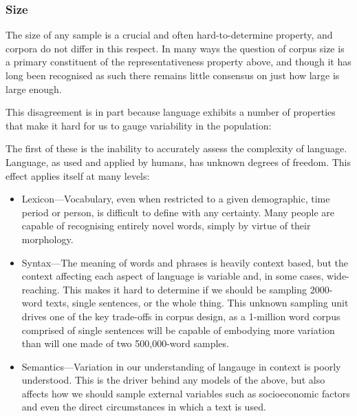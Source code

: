 









\subsubsection{Size}

The size of any sample is a crucial and often hard-to-determine property, and corpora do not differ in this respect.  In many ways the question of corpus size is a primary constituent of the representativeness property above, and though it has long been recognised as such there remains little consensus on just how large is large enough.

This disagreement is in part because language exhibits a number of properties that make it hard for us to gauge variability in the population:


The first of these is the inability to accurately assess the complexity of language.  Language, as used and applied by humans, has unknown degrees of freedom.  This effect applies itself at many levels:

\begin{itemize}
    \item Lexicon---Vocabulary, even when restricted to a given demographic, time period or person, is difficult to define with any certainty.  Many people are capable of recognising entirely novel words, simply by virtue of their morphology. %
    \item Syntax---The meaning of words and phrases is heavily context based, but the context affecting each aspect of language is variable and, in some cases, wide-reaching.  This makes it hard to determine if we should be sampling 2000-word texts, single sentences, or the whole thing.  This unknown sampling unit drives one of the key trade-offs in corpus design, as a 1-million word corpus comprised of single sentences will be capable of embodying more variation than will one made of two 500,000-word samples.
    \item Semantics---Variation in our understanding of langauge in context is poorly understood.  This is the driver behind any models of the above, but also affects how we should sample external variables such as socioeconomic factors and even the direct circumstances in which a text is used.  
\end{itemize}

